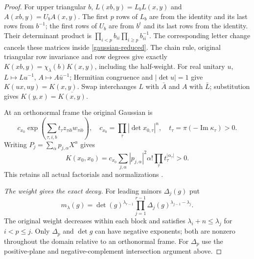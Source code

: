 \begin{proof}
For upper triangular $b$,
$L(xb,y)=L_bL(x,y)$ and $A(xb,y)=U_bA(x,y)$.
The first $p$ rows of $L_b$ are from the identity and its
last rows from $b^{-1}$; the first rows of $U_b$ are from
$b^t$ and its last rows from the identity.
Their determinant product is
$\prod_{i<p}b_{ii}\prod_{i\ge p}b_{ii}^{-1}$.
The corresponding letter change cancels these matrices
inside \eqref{gaussian-reduced}. The chain rule, original
triangular row invariance and row degrees give exactly
$K(xb,y)=\chi_\lambda(b)K(x,y)$, including the half-weight.
For real unitary $u$, $L\mapsto Lu^{-1}$,
$A\mapsto A\bar u^{-1}$; Hermitian congruence and
$|\det u|=1$ give $K(ux,uy)=K(x,y)$.
Swap interchanges $L$ with $\bar A$ and $A$ with
$\bar L$; substitution gives
$K(y,x)=\overline{K(x,y)}$.

At an orthonormal frame the original Gaussian is
\[
 c_{x_0}\exp\!\left(\sum_{\tau,i,b}t_\tau
                     z_{\tau ib}w_{\tau ib}\right),\quad
 c_{x_0}=\prod_\tau|\det x_{0,\tau}|^n,\quad
 t_\tau=\pi(-\operatorname{Im}\kappa_\tau)>0.
\]
Writing $P_j=\sum_\alpha p_{j,\alpha}X^\alpha$ gives
\begin{equation}\label{gaussian-fischer-positive}
 K(x_0,x_0)=c_{x_0}\sum_{j,\alpha}
          |p_{j,\alpha}|^2\alpha!\prod_\tau t_\tau^{|\alpha_\tau|}>0.
\end{equation}
This retains all actual factorials and normalizations
\cite{gaussian-actual-source}.

\emph{The weight gives the exact decay.}
For leading minors $\Delta_j(g)$ put
\[
 m_\lambda(g)=\det(g)^{\lambda_{r-1}}
       \prod_{j=1}^{r-1}\Delta_j(g)^{\lambda_{j-1}-\lambda_j}.
\]
The original weight decreases within each block and satisfies
$\lambda_i+n\le\lambda_j$ for $i<p\le j$.
Only $\Delta_p$ and $\det g$ can have negative exponents;
both are nonzero throughout the domain relative to an
orthonormal frame. For $\Delta_p$ use the positive-plane
and negative-complement intersection argument above.


\end{proof}
